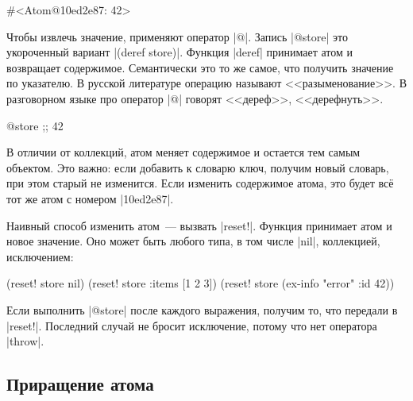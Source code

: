 \begin{english}
  \begin{clojure}
#<Atom@10ed2e87: 42>
  \end{clojure}
\end{english}

\label{deref-intro}

Чтобы извлечь значение, применяют оператор \spverb|@|. Запись \spverb|@store|
это укороченный вариант \spverb|(deref store)|. Функция \spverb|deref| принимает
атом и возвращает содержимое. Семантически это то же самое, что получить
значение по указателю. В русской литературе операцию называют
<<разыменование>>. В разговорном языке про оператор \spverb|@| говорят
<<дереф>>, <<дерефнуть>>.


\begin{english}
  \begin{clojure}
@store ;; 42
  \end{clojure}
\end{english}

В отличии от коллекций, атом меняет содержимое и остается тем самым
объектом. Это важно: если добавить к словарю ключ, получим новый словарь, при
этом старый не изменится. Если изменить содержимое атома, это будет вс\"{е} тот
же атом с номером \spverb|10ed2e87|.


Наивный способ изменить атом~--- вызвать \spverb|reset!|. Функция принимает атом
и новое значение. Оно может быть любого типа, в том числе \spverb|nil|,
коллекцией, исключением:

\begin{english}
  \begin{clojure}
(reset! store nil)
(reset! store {:items [1 2 3]})
(reset! store (ex-info "error" {:id 42}))
  \end{clojure}
\end{english}

Если выполнить \spverb|@store| после каждого выражения, получим то, что передали
в \spverb|reset!|. Последний случай не бросит исключение, потому что нет
оператора \spverb|throw|.

\subsection{Приращение атома}

